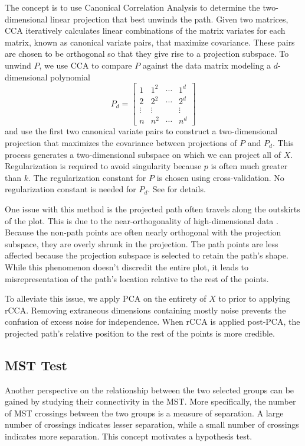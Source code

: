 \documentclass{article}
\begin{document}
The concept is to use Canonical Correlation Analysis to determine the two-dimensional linear projection that best unwinds the path. Given two matrices, CCA iteratively calculates linear combinations of the matrix variates for each matrix, known as canonical variate pairs, that maximize covariance. These pairs are chosen to be orthogonal so that they give rise to a projection subspace. To unwind $P$, we use CCA to compare $P$ against the data matrix modeling a $d$-dimensional polynomial $$P_d = \begin{bmatrix}
1 & 1^2 & \cdots & 1^d \\
2 & 2^2 & \cdots & 2^d \\
\vdots & \vdots & & \vdots \\
n & n^2 & \cdots & n^d
\end{bmatrix}$$
and use the first two canonical variate pairs to construct a two-dimensional projection that maximizes the covariance between projections of $P$ and $P_d$. This process generates a two-dimensional subspace on which we can project all of $X$. Regularization is required to avoid singularity because $p$ is often much greater than $k$. The regularization constant for $P$ is chosen using cross-validation. No regularization constant is needed for $P_d$. See \cite{rCCA} for details.

One issue with this method is the projected path often travels along the outskirts of the plot. This is due to the near-orthogonality of high-dimensional data \cite{near-orthogonal}. Because the non-path points are often nearly orthogonal with the projection subspace, they are overly shrunk in the projection. The path points are less affected because the projection subspace is selected to retain the path's shape. While this phenomenon doesn't discredit the entire plot, it leads to misrepresentation of the path's location relative to the rest of the points.

To alleviate this issue, we apply PCA on the entirety of $X$ to prior to applying rCCA. Removing extraneous dimensions containing mostly noise prevents the confusion of excess noise for independence. When rCCA is applied post-PCA, the projected path's relative position to the rest of the points is more credible.

\subsection{MST Test}
Another perspective on the relationship between the two selected groups can be gained by studying their connectivity in the MST. More specifically, the number of MST crossings between the two groups is a measure of separation. A large number of crossings indicates lesser separation, while a small number of crossings indicates more separation. This concept motivates a hypothesis test.
\end{document}
